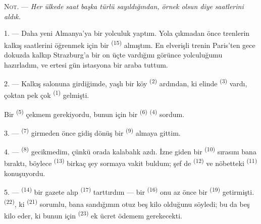 
\VUsaut{4.0mm}
\VUsaut{2.4mm}
\VUsaut{3.4mm}
\textsc{Not.} --- \textit{Her ülkede saat başka türlü sayıldığından, örnek
olsun diye}  \textit{saatlerini aldık.}

1. --- Daha yeni Almanya'ya bir yolculuk yaptım. Yola çıkmadan önce trenlerin
kalkış saatlerini öğrenmek için bir  \textsuperscript{(15)}
almıştım. En elverişli trenin Paris'ten gece dokuzda kalkıp Strazburg'a bir
on üçte vardığını görünce yolculuğumu hazırladım, ve ertesi gün istasyona bir
araba tuttum.

2. --- Kalkış salonuna girdiğimde, yaşlı bir köy 
\textsuperscript{(2)} ardından, ki elinde 
\textsuperscript{(3)} vardı, çoktan pek çok 
\textsuperscript{(1)} gelmişti.

Bir  \textsuperscript{(5)} çekmem gerekiyordu, bunun için bir
 \textsuperscript{(6)} 
\textsuperscript{(4)} sordum.

3. ---  \textsuperscript{(7)} girmeden önce gidiş
dönüş bir  \textsuperscript{(9)} almaya gittim.

4. ---  \textsuperscript{(8)} gecikmedim, çünkü orada kalabalık
azdı. İzne giden bir  \textsuperscript{(10)} sırasını bana
bıraktı, böylece  \textsuperscript{(13)} birkaç şey
sormaya vakit buldum; şef de  \textsuperscript{(12)} ve
nöbetteki  \textsuperscript{(11)} konuşuyordu.

\VUsaut{3.0mm}

5. ---  \textsuperscript{(14)} bir gazete alıp
 \textsuperscript{(17)} tarttırdım --- bir 
\textsuperscript{(16)} onu az önce bir 
\textsuperscript{(19)} getirmişti.  \textsuperscript{(22)}, ki 
\textsuperscript{(21)} sorumlu, bana sandığımın otuz beş kilo
olduğunu söyledi; bu da beş kilo  eder, ki bunun için
 \textsuperscript{(23)} ek ücret ödemem gerekecekti.


